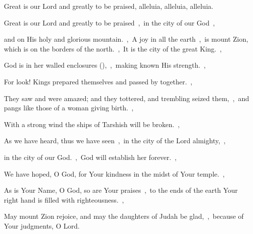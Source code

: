 \documentclass[12pt,twoside,a5paper]{article}
\begin{document}

\begin{halfparskip}
  Great is our Lord and greatly to be praised, alleluia, alleluia, alleluia.

  Great is our Lord and greatly to be praised~\sep\ in the city of our God~\sep

  and on His holy and glorious mountain.~\sep\ A joy in all the earth~\sep\ is mount Zion, which is on the borders of the north.~\sep\ It is the city of the great King.~\sep

  God is in her walled enclosures (),~\sep\ making known His strength.~\sep

  For look! Kings prepared themselves and passed by together.~\sep

  They saw and were amazed; and they tottered, and trembling seized them,~\sep\ and pangs like those of a woman giving birth.~\sep

  With a strong wind the ships of Tarshish will be broken.~\sep

  As we have heard, thus we have seen~\sep\ in the city of the Lord almighty,~\sep

  in the city of our God.~\sep\ God will establish her forever.~\sep

  We have hoped, O God, for Your kindness in the midst of Your temple.~\sep

  As is Your Name, O God, so are Your praises~\sep\ to the ends of the earth Your right hand is filled with righteousness.~\sep

  May mount Zion rejoice, and may the daughters of Judah be glad,~\sep\ because of Your judgments, O Lord.
\end{halfparskip}

\end{document}
